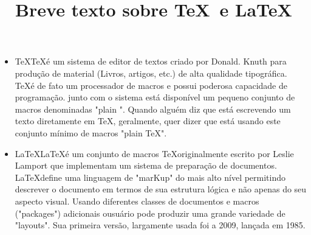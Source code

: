 \documentclass[12pt]{memoir}
\begin{document}
	
\title{	Breve texto sobre \TeX\ e \LaTeX}
\maketitle

\begin{itemize}	
\item \TeX \TeX é um sistema de editor de textos criado por
  Donald. Knuth para produção de material (Livros, artigos, etc.) de
  alta qualidade tipográfica. \TeX é de fato um processador de macros
  e possui poderosa capacidade de programação. junto com o sistema
  está disponível um pequeno conjunto de macros denominadas "plain
  \texciicircum". Quando alguém diz que está escrevendo um texto
  diretamente em \TeX , geralmente, quer dizer que está usando este
  conjunto mínimo de macros "plain \TeX ".

\item \LaTeX \LaTeX é um conjunto de macros \TeX originalmente escrito
  por Leslie Lamport que implementam um sistema de preparação de
  documentos. \LaTeX define uma linguagem de "marKup" do mais alto
  nível permitindo descrever o documento em termos de sua estrutura
  lógica e não apenas do seu aspecto visual. Usando diferentes classes
  de documentos e macros ("packages") adicionais ousuário pode
  produzir uma grande variedade de "layouts". Sua primeira versão,
  largamente usada foi a 2009, lançada em 1985.


\end{itemize}	
	
	
	
	
	
	
	
	
	
\end{document}

